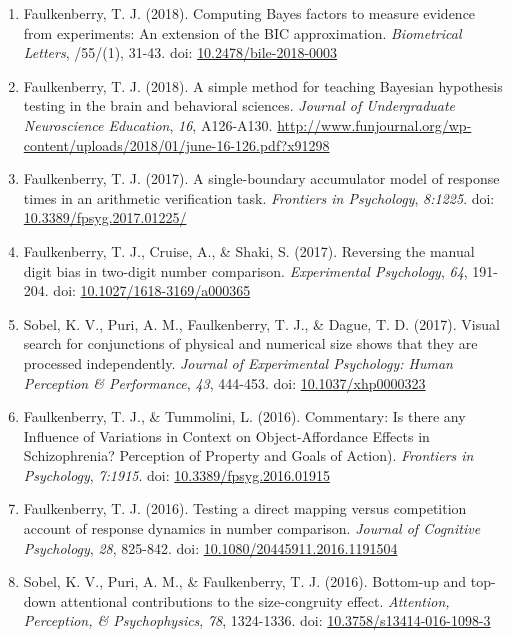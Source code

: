 \documentclass[article,10pt]{article}
\begin{document}
\begin{enumerate}
\item Faulkenberry, T. J. (2018). Computing Bayes factors to measure evidence from experiments: An extension of the BIC approximation. \emph{Biometrical Letters}, /55/(1), 31-43. doi: \href{https://doi.org/10.2478/bile-2018-0003}{10.2478/bile-2018-0003}
\item Faulkenberry, T. J. (2018). A simple method for teaching Bayesian hypothesis testing in the brain and behavioral sciences. \emph{Journal of Undergraduate Neuroscience Education}, \emph{16}, A126-A130. \url{http://www.funjournal.org/wp-content/uploads/2018/01/june-16-126.pdf?x91298}
\item Faulkenberry, T. J. (2017). A single-boundary accumulator model of response times in an arithmetic verification task. \emph{Frontiers in Psychology}, \emph{8:1225}. doi: \href{http://dx.doi.org/10.3389/fpsyg.2017.01225}{10.3389/fpsyg.2017.01225/}
\item Faulkenberry, T. J., Cruise, A., \& Shaki, S. (2017). Reversing the manual digit bias in two-digit number comparison. \emph{Experimental Psychology}, \emph{64}, 191-204.  doi: \href{http://dx.doi.org/10.1027/1618-3169/a000365}{10.1027/1618-3169/a000365}
\item Sobel, K. V., Puri, A. M., Faulkenberry, T. J., \& Dague, T. D. (2017). Visual search for conjunctions of physical and numerical size shows that they are processed independently. \emph{Journal of Experimental Psychology: Human Perception \& Performance}, \emph{43}, 444-453. doi: \href{http://dx.doi.org/10.1037/xhp0000323}{10.1037/xhp0000323}
\item Faulkenberry, T. J., \& Tummolini, L. (2016). Commentary: Is there any Influence of Variations in Context on Object-Affordance Effects in Schizophrenia? Perception of Property and Goals of Action). \emph{Frontiers in Psychology}, \emph{7:1915}. doi: \href{http://dx.doi.org/10.3389/fpsyg.2016.01915}{10.3389/fpsyg.2016.01915}
\item Faulkenberry, T. J. (2016). Testing a direct mapping versus competition account of response dynamics in number comparison. \emph{Journal of Cognitive Psychology}, \emph{28}, 825-842. doi: \href{http://dx.doi.org/10.1080/20445911.2016.1191504}{10.1080/20445911.2016.1191504}
\item Sobel, K. V., Puri, A. M., \& Faulkenberry, T. J. (2016). Bottom-up and top-down attentional contributions to the size-congruity effect. \emph{Attention, Perception, \& Psychophysics}, \emph{78}, 1324-1336. doi: \href{http://dx.doi.org/10.3758/s13414-016-1098-3}{10.3758/s13414-016-1098-3}

\end{enumerate}
\end{document}
